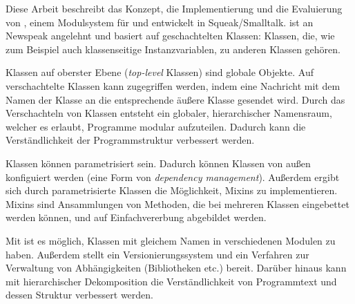 \begin{zusammenfassung}
Diese Arbeit beschreibt das Konzept, die Implementierung und die Evaluierung von \msname, einem Modulsystem für und entwickelt in Squeak/Smalltalk. \msname ist an Newspeak angelehnt und basiert auf geschachtelten Klassen: Klassen, die, wie zum Beispiel auch klassenseitige Instanzvariablen, zu anderen Klassen gehören.

Klassen auf oberster Ebene (\emph{top-level} Klassen) sind globale Objekte. Auf verschachtelte Klassen kann zugegriffen werden, indem eine Nachricht mit dem Namen der Klasse an die entsprechende äußere Klasse gesendet wird. Durch das Verschachteln von Klassen entsteht ein globaler, hierarchischer Namensraum, welcher es erlaubt, Programme modular aufzuteilen. Dadurch kann die Verständlichkeit der Programmstruktur verbessert werden.

Klassen können parametrisiert sein. Dadurch können Klassen von außen konfiguiert werden (eine Form von \emph{dependency management}). Außerdem ergibt sich durch parametrisierte Klassen die Möglichkeit, Mixins zu implementieren. Mixins sind Ansammlungen von Methoden, die bei mehreren Klassen eingebettet werden können, und auf Einfachvererbung abgebildet werden. 

Mit \msname ist es möglich, Klassen mit gleichem Namen in verschiedenen Modulen zu haben. Außerdem stellt \msname ein Versionierungssystem und ein Verfahren zur Verwaltung  von Abhängigkeiten (Bibliotheken etc.) bereit. Darüber hinaus kann mit hierarchischer Dekomposition die Verständlichkeit von Programmtext und dessen Struktur verbessert werden.
\end{zusammenfassung}

